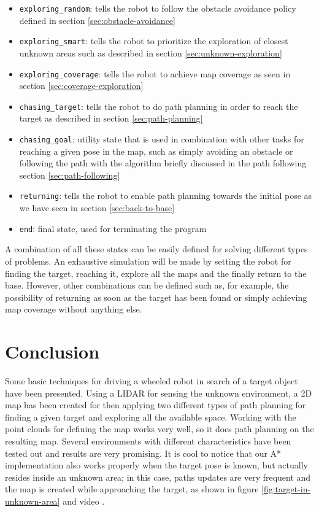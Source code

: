\documentclass[9pt,conference]{IEEEtran}
\begin{document}
\begin{itemize}
    \item \texttt{exploring\_random}: tells the robot to follow the obstacle avoidance policy defined in section \ref{sec:obstacle-avoidance}
    \item \texttt{exploring\_smart}: tells the robot to prioritize the exploration of closest unknown areas such as described in section \ref{sec:unknown-exploration}
    \item \texttt{exploring\_coverage}: tells the robot to achieve map coverage as seen in section \ref{sec:coverage-exploration}
    \item \texttt{chasing\_target}: tells the robot to do path planning in order to reach the target as described in section \ref{sec:path-planning}
    \item \texttt{chasing\_goal}: utility state that is used in combination with other tasks for reaching a given pose in the map, such as simply avoiding an obstacle or following the path with the algorithm briefly discussed in the path following section \ref{sec:path-following}
    \item \texttt{returning}: tells the robot to enable path planning towards the initial pose as we have seen in section \ref{sec:back-to-base}
    \item \texttt{end}: final state, used for terminating the program
\end{itemize}

A combination of all these states can be easily defined for solving different types of problems. An exhaustive simulation will be made by setting the robot for finding the target, reaching it, explore all the maps and the finally return to the base. However, other combinations can be defined such as, for example, the possibility of returning as soon as the target has been found or simply achieving map coverage without anything else.




\section{Conclusion}

Some basic techniques for driving a wheeled robot in search of a target object have been presented. Using a LIDAR for sensing the unknown environment, a 2D map has been created for then applying two different types of path planning for finding a given target and exploring all the available space. Working with the point clouds for defining the map works very well, so it does path planning on the resulting map. Several environments with different characteristics have been tested out and results are very promising. It is cool to notice that our A* implementation also works properly when the target pose is known, but actually resides inside an unknown area; in this case, paths updates are very frequent and the map is created while approaching the target, as shown in figure \ref{fig:target-in-unknown-area} and video \cite{demo-unknown-target-reaching}.
\end{document}
